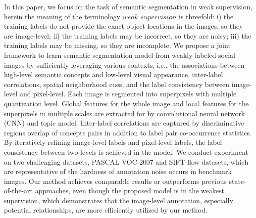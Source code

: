 
In this paper,  we focus on the task of semantic segmentation in weak supervision, herein the
meaning of the terminology $weak$ $ supervision$ is threefold: i) the training labels do not provide the
exact object locations in the images, so they are image-level; ii)
 the training labels may be incorrect, so they are noisy;
 iii) the training labels may be missing, so they are incomplete.
  We propose a  joint framework  to learn  semantic segmentation model from weakly labeled social images by sufficiently leveraging various contexts, i.e., the associations between high-level semantic concepts and low-level visual appearance, inter-label correlations, spatial neighborhood cues, and the label consistency between image-level and pixel-level. Each image is segmented  into  superpixels with multiple quantization level.  Global features for the whole image and local features for the superpixels in multiple scales   are extracted for by convolutional neural network (CNN) and topic model. Inter-label correlations  are captured by discriminative regions overlap of concepts pairs in addition to label pair co-occurrence statistics. By iteratively refining image-level labels and pixel-level labels, the label consistency between two levels is achieved in the model. We conduct experiment  on two challenging datasets, PASCAL VOC 2007 and SIFT-flow datasets,  which are representative of the hardness of annotation noise occurs in benchmark images. Our method achieves comparable results or outperforms previous state-of-the-art approaches, even though the proposed model is in the weakest  supervision, which  demonstrates that the image-level annotation, especially potential relationships, are more efficiently utilized by our method.

